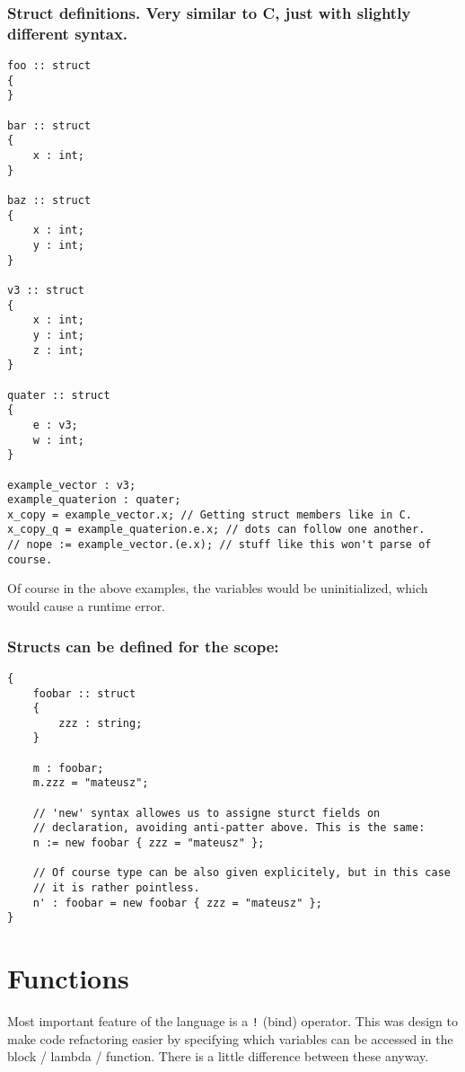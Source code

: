 \documentclass[11pt]{article}
\begin{document}
\subsubsection*{Struct definitions. Very similar to C, just with slightly different syntax.}
\label{sec:org2d274f9}
\begin{verbatim}
foo :: struct
{
}

bar :: struct
{
    x : int;
}

baz :: struct
{
    x : int;
    y : int;
}

v3 :: struct
{
    x : int;
    y : int;
    z : int;
}

quater :: struct
{
    e : v3;
    w : int;
}

example_vector : v3;
example_quaterion : quater;
x_copy = example_vector.x; // Getting struct members like in C.
x_copy_q = example_quaterion.e.x; // dots can follow one another.
// nope := example_vector.(e.x); // stuff like this won't parse of course.

\end{verbatim}

Of course in the above examples, the variables would be uninitialized, which
would cause a runtime error.

\subsubsection*{Structs can be defined for the scope:}
\label{sec:org222db4a}
\begin{verbatim}
{
    foobar :: struct
    {
        zzz : string;
    }

    m : foobar;
    m.zzz = "mateusz";

    // 'new' syntax allowes us to assigne sturct fields on
    // declaration, avoiding anti-patter above. This is the same:
    n := new foobar { zzz = "mateusz" };

    // Of course type can be also given explicitely, but in this case
    // it is rather pointless.
    n' : foobar = new foobar { zzz = "mateusz" };
}
\end{verbatim}

\section*{Functions}
\label{sec:orgbd7b0dc}

Most important feature of the language is a \texttt{!} (bind) operator. This was design
to make code refactoring easier by specifying which variables can be accessed in
the block / lambda / function. There is a little difference between these
anyway.
\end{document}
